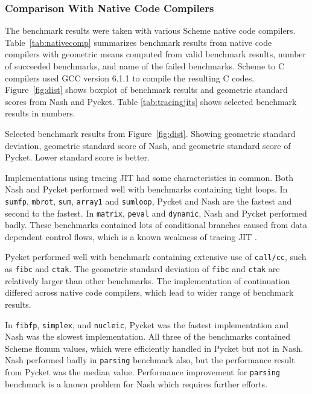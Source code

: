 \documentclass[preprint, 10pt]{sigplanconf}
\begin{document}
\subsubsection{Comparison With Native Code Compilers}

The benchmark results were taken with various Scheme native code compilers.
Table~\hyperref[tab:impls]{\ref{tab:nativecomp}} summarizes benchmark results
from native code compilers with geometric means computed from valid benchmark
results, number of succeeded benchmarks, and name of the failed
benchmarks. Scheme to C compilers used GCC version 6.1.1 to compile the
resulting C codes. Figure~\hyperref[fig:dist]{\ref{fig:dist}} shows boxplot of
benchmark results and geometric standard scores from Nash and Pycket. Table
\hyperref[tab:tracingjits]{\ref{tab:tracingjits}} shows selected benchmark
results in numbers.

\begin{table}
  \centering
  
  \caption{Selected benchmark results from
    Figure~\hyperref[fig:dist]{\ref{fig:dist}}. Showing geometric standard
    deviation, geometric standard score of Nash, and geometric standard score
    of Pycket. Lower standard score is better.}
\label{tab:tracingjits}
\end{table}

Implementations using tracing JIT had some characteristics in common. Both
Nash and Pycket performed well with benchmarks containing tight loops. In
\texttt{sumfp}, \texttt{mbrot}, \texttt{sum}, \texttt{array1} and
\texttt{sumloop}, Pycket and Nash are the fastest and second to the fastest.
In \texttt{matrix}, \texttt{peval} and \texttt{dynamic}, Nash and Pycket
performed badly. These benchmarks contained lots of conditional branches
caused from data dependent control flows, which is a known weakness of tracing
JIT \citep{bauman2015pycket}.

Pycket performed well with benchmark containing extensive use of
\texttt{call/cc}, such as \texttt{fibc} and \texttt{ctak}. The geometric
standard deviation of \texttt{fibc} and \texttt{ctak} are relatively larger
than other benchmarks. The implementation of continuation differed across
native code compilers, which lead to wider range of benchmark results.

In \texttt{fibfp}, \texttt{simplex}, and \texttt{nucleic}, Pycket was the
fastest implementation and Nash was the slowest implementation. All three of
the benchmarks contained Scheme flonum values, which were efficiently handled
in Pycket but not in Nash.  Nash performed badly in \texttt{parsing} benchmark
also, but the performance result from Pycket was the median value. Performance
improvement for \texttt{parsing} benchmark is a known problem for Nash which
requires further efforts.
\end{document}
